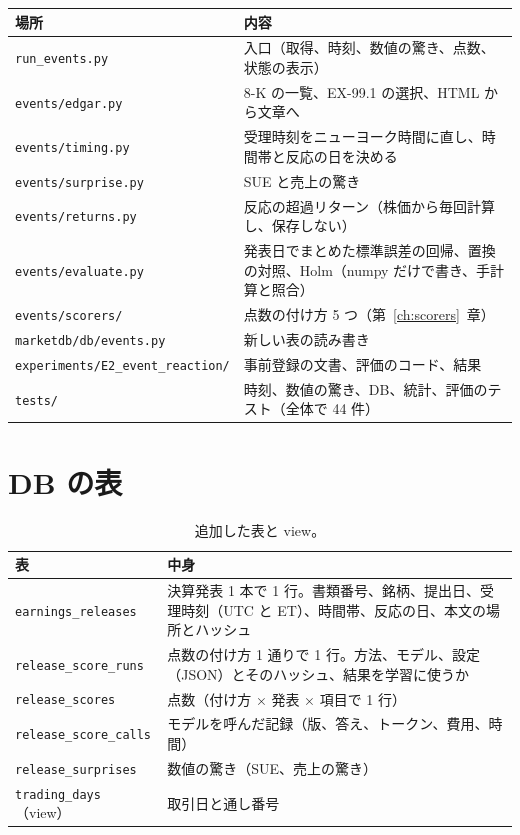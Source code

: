 \documentclass[xelatex,ja=standard,jafont=haranoaji,a4paper,10pt]{bxjsreport}
\newcommand{\code}[1]{\texttt{#1}}
\newcommand{\chapref}[1]{第~\ref{#1}~章}
\begin{document}
\begin{longtable}{p{4.6cm}p{9.6cm}}
\toprule
\textbf{場所} & \textbf{内容} \\
\midrule
\endfirsthead
\bottomrule
\endfoot
\code{run\_events.py} & 入口（取得、時刻、数値の驚き、点数、状態の表示） \\
\code{events/edgar.py} & 8-K の一覧、EX-99.1 の選択、HTML から文章へ \\
\code{events/timing.py} & 受理時刻をニューヨーク時間に直し、時間帯と反応の日を決める \\
\code{events/surprise.py} & SUE と売上の驚き \\
\code{events/returns.py} & 反応の超過リターン（株価から毎回計算し、保存しない） \\
\code{events/evaluate.py} & 発表日でまとめた標準誤差の回帰、置換の対照、Holm（numpy だけで書き、手計算と照合） \\
\code{events/scorers/} & 点数の付け方 5 つ（\chapref{ch:scorers}） \\
\code{marketdb/db/events.py} & 新しい表の読み書き \\
\code{experiments/E2\_event\_reaction/} & 事前登録の文書、評価のコード、結果 \\
\code{tests/} & 時刻、数値の驚き、DB、統計、評価のテスト（全体で 44 件） \\
\end{longtable}

\section{DB の表}

\begin{table}[H]
\centering
\caption{追加した表と view。}
\small
\begin{tabular}{lp{10.2cm}}
\toprule
表 & 中身 \\
\midrule
\code{earnings\_releases} & 決算発表 1 本で 1 行。書類番号、銘柄、提出日、受理時刻（UTC と ET）、時間帯、反応の日、本文の場所とハッシュ \\
\code{release\_score\_runs} & 点数の付け方 1 通りで 1 行。方法、モデル、設定（JSON）とそのハッシュ、結果を学習に使うか \\
\code{release\_scores} & 点数（付け方 × 発表 × 項目で 1 行） \\
\code{release\_score\_calls} & モデルを呼んだ記録（版、答え、トークン、費用、時間） \\
\code{release\_surprises} & 数値の驚き（SUE、売上の驚き） \\
\code{trading\_days}（view） & 取引日と通し番号 \\
\bottomrule
\end{tabular}
\end{table}
\end{document}
